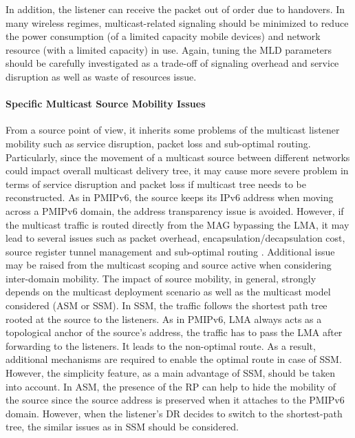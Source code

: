 In addition, the listener can receive the packet out of order due to handovers. In many wireless regimes, multicast-related signaling should be minimized to reduce the power consumption (of a limited capacity mobile devices) and network resource (with a limited capacity) in use. Again, tuning the MLD parameters \cite{tuning_MLD} should be carefully investigated as a trade-off of signaling overhead and service disruption as well as waste of resources issue. 
  
\paragraph{Specific Multicast Source Mobility Issues}
From a source point of view, it inherits some problems of the multicast listener mobility such as service disruption, packet loss and sub-optimal routing. Particularly, since the movement of a multicast source between different networks could impact overall multicast delivery tree, it may cause more severe problem in terms of service disruption and packet loss if multicast tree needs to be reconstructed. As in PMIPv6, the source keeps its IPv6 address when moving across a PMIPv6 domain, the address transparency issue is avoided. However, if the multicast traffic is routed directly from the MAG bypassing the LMA, it may lead to several issues such as packet overhead, encapsulation/decapsulation cost, source register tunnel management and sub-optimal routing \cite{PIM_SM, multicast_source}. Additional issue may be raised from the multicast scoping and source active when considering inter-domain mobility. The impact of source mobility, in general, strongly depends on the multicast deployment scenario as well as the multicast model considered (ASM or SSM). In SSM, the traffic follows the shortest path tree rooted at the source to the listeners. As in PMIPv6, LMA always acts as a topological anchor of the source's address, the traffic has to pass the LMA after forwarding to the listeners. It leads to the non-optimal route. As a result, additional mechanisms are required to enable the optimal route in case of SSM. However, the simplicity feature, as a main advantage of SSM, should be taken into account. In ASM, the presence of the RP can help to hide the mobility of the source since the source address is preserved when it attaches to the PMIPv6 domain. However, when the listener's DR decides to switch to the shortest-path tree, the similar issues as in SSM should be considered. 
